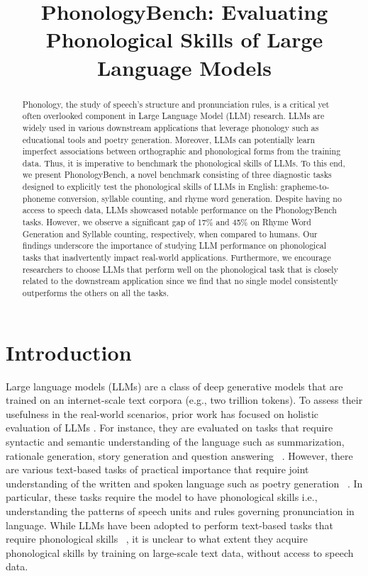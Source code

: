 \title{PhonologyBench: Evaluating Phonological Skills of Large Language Models}

\begin{abstract}
Phonology, the study of speech's structure and pronunciation rules, is a critical yet often overlooked component in Large Language Model (LLM) research. LLMs are widely used in various downstream applications that leverage phonology such as educational tools and poetry generation. Moreover, LLMs can potentially learn imperfect associations between orthographic and phonological forms from the training data. Thus, it is imperative to benchmark the phonological skills of LLMs. To this end, we present PhonologyBench, a novel benchmark consisting of three diagnostic tasks designed to explicitly test the phonological skills of LLMs in English: grapheme-to-phoneme conversion, syllable counting, and rhyme word generation. Despite having no access to speech data, LLMs showcased notable performance on the PhonologyBench tasks. However, we observe a significant gap of 17\% and 45\% on Rhyme Word Generation and Syllable counting, respectively, when compared to humans. Our findings underscore the importance of studying LLM performance on phonological tasks that inadvertently impact real-world applications. Furthermore, we encourage researchers to choose LLMs that perform well on the phonological task that is closely related to the downstream application since we find that no single model consistently outperforms the others on all the tasks.
\end{abstract}

\section{Introduction}

Large language models (LLMs) are a class of deep generative models \citep{ruthotto2021introduction,bond2021deep} that are trained on an internet-scale text corpora (e.g., two trillion tokens).  To assess their usefulness in the real-world scenarios, prior work has focused on holistic evaluation of LLMs \citep{liang2022holistic}. For instance, they are evaluated on tasks that require syntactic and semantic understanding of the language such as summarization, rationale generation, story generation and question answering ~\citep{liang2022holistic,zheng2023judging, valmeekam2023large, bang2023multitask, open-llm-leaderboard, qin2023chatgpt, Koco__2023, sun2023evaluating}. However, there are various text-based tasks of practical importance that require joint understanding of the written and spoken language such as poetry generation ~\citep{ormazabal2022poelm,henderson1965haiku, suzuki1985role}. In particular, these tasks require the model to have phonological skills i.e., understanding the patterns of speech units and rules governing pronunciation in language. While LLMs have been adopted to perform text-based tasks that require phonological skills ~\citep{ding2024songcomposer, kwon2023interfaces}, it is unclear to what extent they acquire phonological skills by training on large-scale text data, without access to speech data.


